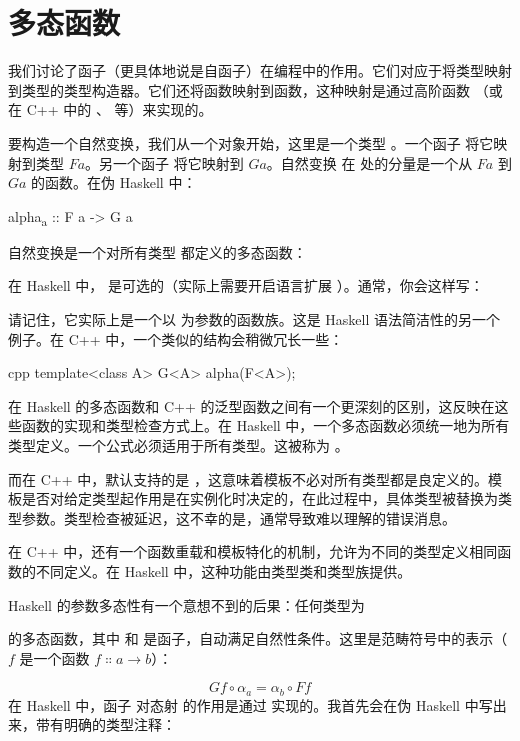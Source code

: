 \section{多态函数}

我们讨论了函子（更具体地说是自函子）在编程中的作用。它们对应于将类型映射到类型的类型构造器。它们还将函数映射到函数，这种映射是通过高阶函数 （或在 C++ 中的 、 等）来实现的。

要构造一个自然变换，我们从一个对象开始，这里是一个类型 。一个函子  将它映射到类型 $F a$。另一个函子  将它映射到 $G a$。自然变换  在  处的分量是一个从 $F a$ 到 $G a$ 的函数。在伪 Haskell 中：

\begin{snipv}
  alpha\textsubscript{a} :: F a -> G a
\end{snipv}
自然变换是一个对所有类型  都定义的多态函数：

在 Haskell 中， 是可选的（实际上需要开启语言扩展 ）。通常，你会这样写：

请记住，它实际上是一个以  为参数的函数族。这是 Haskell 语法简洁性的另一个例子。在 C++ 中，一个类似的结构会稍微冗长一些：

\begin{snip}{cpp}
  template<class A> G<A> alpha(F<A>);
\end{snip}
在 Haskell 的多态函数和 C++ 的泛型函数之间有一个更深刻的区别，这反映在这些函数的实现和类型检查方式上。在 Haskell 中，一个多态函数必须统一地为所有类型定义。一个公式必须适用于所有类型。这被称为 。

而在 C++ 中，默认支持的是 ，这意味着模板不必对所有类型都是良定义的。模板是否对给定类型起作用是在实例化时决定的，在此过程中，具体类型被替换为类型参数。类型检查被延迟，这不幸的是，通常导致难以理解的错误消息。

在 C++ 中，还有一个函数重载和模板特化的机制，允许为不同的类型定义相同函数的不同定义。在 Haskell 中，这种功能由类型类和类型族提供。

Haskell 的参数多态性有一个意想不到的后果：任何类型为

的多态函数，其中  和  是函子，自动满足自然性条件。这里是范畴符号中的表示（$f$ 是一个函数 $f \Colon a \to b$）：

\[G f \circ \alpha_a = \alpha_b \circ F f\]
在 Haskell 中，函子  对态射  的作用是通过  实现的。我首先会在伪 Haskell 中写出来，带有明确的类型注释：


